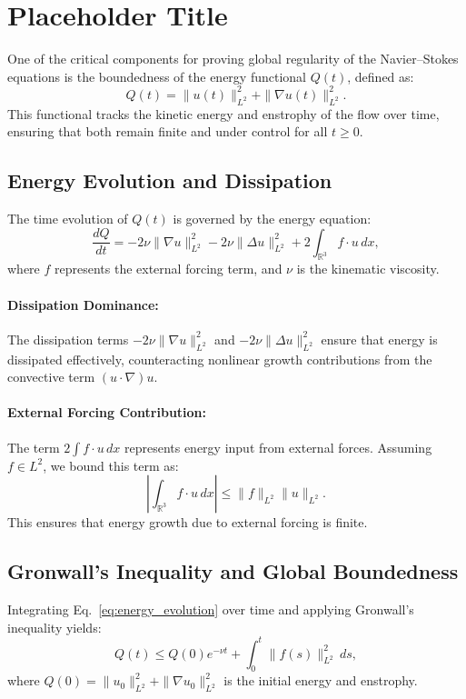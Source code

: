 \section{Placeholder Title}

One of the critical components for proving global regularity of the Navier--Stokes equations is the boundedness of the energy functional $Q(t)$, defined as:
\begin{equation}
Q(t) = \|u(t)\|_{L^2}^2 + \|\nabla u(t)\|_{L^2}^2.
\label{eq:qt_definition}
\end{equation}
This functional tracks the kinetic energy and enstrophy of the flow over time, ensuring that both remain finite and under control for all $t \geq 0$.

\subsection{Energy Evolution and Dissipation}
The time evolution of $Q(t)$ is governed by the energy equation:
\begin{equation}
\frac{dQ}{dt} = -2\nu \|\nabla u\|_{L^2}^2 - 2\nu \|\Delta u\|_{L^2}^2 + 2 \int_{\mathbb{R}^3} f \cdot u \, dx,
\label{eq:energy_evolution}
\end{equation}
where $f$ represents the external forcing term, and $\nu$ is the kinematic viscosity.

\paragraph{Dissipation Dominance:}
The dissipation terms $-2\nu \|\nabla u\|_{L^2}^2$ and $-2\nu \|\Delta u\|_{L^2}^2$ ensure that energy is dissipated effectively, counteracting nonlinear growth contributions from the convective term $(u \cdot \nabla)u$.

\paragraph{External Forcing Contribution:}
The term $2 \int f \cdot u \, dx$ represents energy input from external forces. Assuming $f \in L^2$, we bound this term as:
\begin{equation}
\left| \int_{\mathbb{R}^3} f \cdot u \, dx \right| \leq \|f\|_{L^2} \|u\|_{L^2}.
\end{equation}
This ensures that energy growth due to external forcing is finite.

\subsection{Gronwall’s Inequality and Global Boundedness}
Integrating Eq.~\eqref{eq:energy_evolution} over time and applying Gronwall’s inequality yields:
\begin{equation}
Q(t) \leq Q(0) e^{-\nu t} + \int_0^t \|f(s)\|_{L^2}^2 \, ds,
\label{eq:qt_boundedness}
\end{equation}
where $Q(0) = \|u_0\|_{L^2}^2 + \|\nabla u_0\|_{L^2}^2$ is the initial energy and enstrophy.

